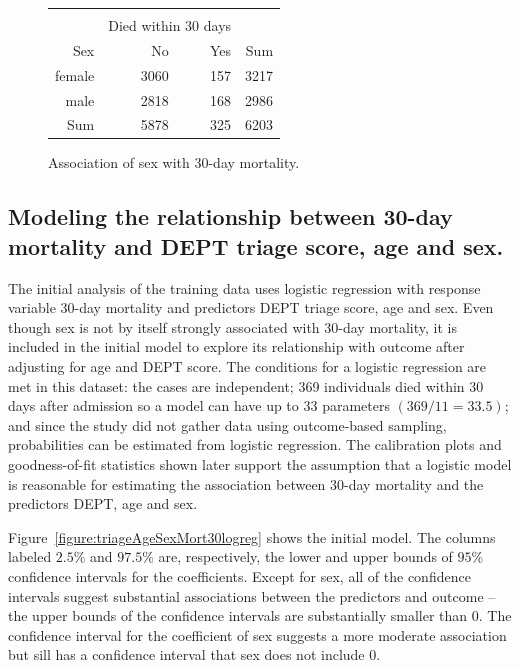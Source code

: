 \begin{figure}[ht]
\centering
\begin{tabular}{rrrr}
  \hline \\
    & \multicolumn{2}{c}{Died within 30 days} & \\
 Sex & No & Yes & Sum \\
  \hline
female & 3060 & 157 & 3217 \\
  male & 2818 & 168 & 2986 \\
  Sum & 5878 & 325 & 6203 \\
   \hline
\end{tabular}
\caption{Association of sex with
       30-day mortality.}
\label{figure:sexMort30Table}
\end{figure}

\subsection{Modeling the relationship between 30-day mortality and DEPT triage score, age and sex.}
\label{section:triageModelDEPTAgeSex}

The initial analysis of the training data uses logistic regression with response variable 30-day mortality and predictors DEPT triage score, age and sex.  Even though sex is not by itself strongly associated with 30-day mortality, it is included in the initial model to explore its relationship with outcome after adjusting for age and DEPT score.   The conditions for a logistic regression are met in this dataset: the cases are independent; 369 individuals died within 30 days after admission so a model can have up to 33 parameters $(369/11 = 33.5)$; and since the study did not gather data using outcome-based sampling, probabilities can be estimated from logistic regression.  The calibration plots and goodness-of-fit statistics shown later support the assumption that a logistic model is reasonable for estimating the association between 30-day mortality and the predictors DEPT, age and sex.

Figure~\ref{figure:triageAgeSexMort30logreg} shows the initial model. The columns labeled $2.5\%$ and $97.5\%$ are, respectively, the lower and upper bounds of $95\%$ confidence intervals for the coefficients. Except for sex, all of the confidence intervals suggest substantial associations between the predictors and outcome -- the upper bounds of the confidence intervals are substantially smaller than 0. The confidence interval for the coefficient of sex suggests a more moderate association but sill has a confidence interval that sex does not include 0. 

